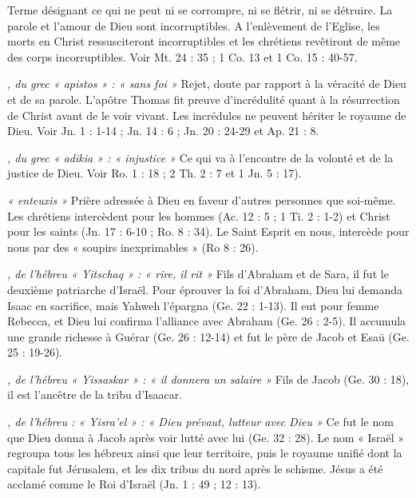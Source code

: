\begin{multicols}{2}
\textit{}\newline
Terme désignant ce qui ne peut ni se corrompre, ni se flétrir, ni se détruire. La parole et l’amour de Dieu sont incorruptibles. A l'enlèvement de l'Eglise, les morts en Christ ressusciteront incorruptibles et les chrétiens revêtiront de même des corps incorruptibles. Voir Mt. 24 : 35 ; 1 Co. 13 et 1 Co. 15 : 40-57.

\textit{, du grec « apistos » : « sans foi »}\newline
Rejet, doute par rapport à la véracité de Dieu et de sa parole. L'apôtre Thomas fit preuve d’incrédulité quant à la résurrection de Christ avant de le voir vivant. Les incrédules ne peuvent hériter le royaume de Dieu. Voir Jn. 1 : 1-14 ; Jn. 14 : 6 ; Jn. 20 : 24-29 et Ap. 21 : 8.

\textit{, du grec « adikia » : « injustice »}\newline
Ce qui va à l'encontre de la volonté et de la justice de Dieu. Voir Ro. 1 : 18 ; 2 Th. 2 : 7 et 1 Jn. 5 : 17).

\textit{« enteuxis »}\newline
Prière adressée à Dieu en faveur d'autres personnes que soi-même. Les chrétiens intercèdent pour les hommes (Ac. 12 : 5 ; 1 Ti. 2 : 1-2) et Christ pour les saints (Jn. 17 : 6-10 ; Ro. 8 : 34). Le Saint Esprit en nous, intercède pour nous par des « soupirs inexprimables » (Ro 8 : 26).

\textit{, de l'hébreu « Yitschaq » : « rire, il rit »}\newline
Fils d'Abraham et de Sara, il fut le deuxième patriarche d'Israël.
Pour éprouver la foi d'Abraham, Dieu lui demanda Isaac en sacrifice, mais Yahweh l'épargna (Ge. 22 : 1-13). Il eut pour femme Rebecca, et Dieu lui confirma l'alliance avec Abraham (Ge. 26 : 2-5). Il accumula une grande richesse à Guérar (Ge. 26 : 12-14) et fut le père de Jacob et Esaü (Ge. 25 : 19-26).

\textit{, de l'hébreu « Yissaskar » : « il donnera un salaire »}\newline
Fils de Jacob (Ge. 30 : 18), il est l'ancêtre de la tribu d'Isaacar.

\textit{, de l'hébreu : « Yisra'el » : « Dieu prévaut, lutteur avec Dieu »}\newline
Ce fut le nom que Dieu donna à Jacob après voir lutté avec lui (Ge. 32 : 28). Le nom « Israël » regroupa tous les hébreux ainsi que leur territoire, puis le royaume unifié dont la capitale fut Jérusalem, et les dix tribus du nord après le schisme. Jésus a été acclamé comme le Roi d'Israël (Jn. 1 : 49 ; 12 : 13).


\end{multicols}
